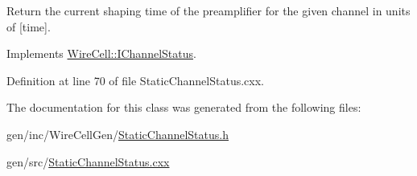 Return the current shaping time of the preamplifier for the given channel in units of \mbox{[}time\mbox{]}. 

Implements \hyperlink{class_wire_cell_1_1_i_channel_status_a330bd0e9627def4736eb1caed6a2fdba}{Wire\+Cell\+::\+I\+Channel\+Status}.



Definition at line 70 of file Static\+Channel\+Status.\+cxx.



The documentation for this class was generated from the following files\+:\begin{DoxyCompactItemize}
\item 
gen/inc/\+Wire\+Cell\+Gen/\hyperlink{_static_channel_status_8h}{Static\+Channel\+Status.\+h}\item 
gen/src/\hyperlink{_static_channel_status_8cxx}{Static\+Channel\+Status.\+cxx}\end{DoxyCompactItemize}
